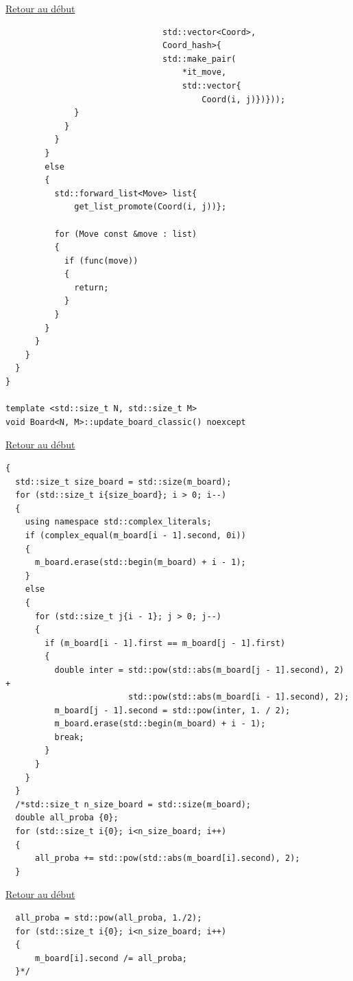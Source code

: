 {\begin{frame}[fragile]
\hyperlink{conclusion}{Retour au début}\newline
\begin{verbatim}
                                std::vector<Coord>,
                                Coord_hash>{
                                std::make_pair(
                                    *it_move,
                                    std::vector{
                                        Coord(i, j)})}));
              }
            }
          }
        }
        else
        {
          std::forward_list<Move> list{
              get_list_promote(Coord(i, j))};

          for (Move const &move : list)
          {
            if (func(move))
            {
              return;
            }
          }
        }
      }
    }
  }
}

template <std::size_t N, std::size_t M>
void Board<N, M>::update_board_classic() noexcept
\end{verbatim}
\end{frame}

\begin{frame}[fragile]
\hyperlink{conclusion}{Retour au début}\newline
\begin{verbatim}
{
  std::size_t size_board = std::size(m_board);
  for (std::size_t i{size_board}; i > 0; i--)
  {
    using namespace std::complex_literals;
    if (complex_equal(m_board[i - 1].second, 0i))
    {
      m_board.erase(std::begin(m_board) + i - 1);
    }
    else
    {
      for (std::size_t j{i - 1}; j > 0; j--)
      {
        if (m_board[i - 1].first == m_board[j - 1].first)
        {
          double inter = std::pow(std::abs(m_board[j - 1].second), 2) +
                         std::pow(std::abs(m_board[i - 1].second), 2);
          m_board[j - 1].second = std::pow(inter, 1. / 2);
          m_board.erase(std::begin(m_board) + i - 1);
          break;
        }
      }
    }
  }
  /*std::size_t n_size_board = std::size(m_board);
  double all_proba {0};
  for (std::size_t i{0}; i<n_size_board; i++)
  {
      all_proba += std::pow(std::abs(m_board[i].second), 2);
  }
\end{verbatim}
\end{frame}

\begin{frame}[fragile]
\hyperlink{conclusion}{Retour au début}\newline
\begin{verbatim}
  all_proba = std::pow(all_proba, 1./2);
  for (std::size_t i{0}; i<n_size_board; i++)
  {
      m_board[i].second /= all_proba;
  }*/


\end{verbatim}
\end{frame}}
